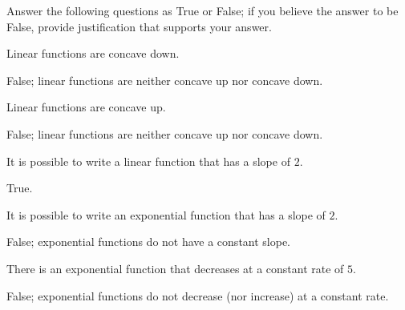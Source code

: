 \begin{exercises}
\begin{problem}
Answer the following questions as True or False; if you believe the answer 
to be False, provide justification that supports your answer.
\begin{subproblem}
	Linear functions are concave down.
	\begin{shortsolution}
		False; linear functions are neither concave up nor concave down.
	\end{shortsolution}
\end{subproblem}
\begin{subproblem}
	Linear functions are concave up.
	\begin{shortsolution}
		False; linear functions are neither concave up nor concave down.
	\end{shortsolution}
\end{subproblem}
\begin{subproblem}
	It is possible to write a linear function that has a slope of $2$.
	\begin{shortsolution}
		True.
	\end{shortsolution}
\end{subproblem}
\begin{subproblem}
	It is possible to write an exponential function that has a slope of $2$.
	\begin{shortsolution}
		False; exponential functions do not have a constant slope.
	\end{shortsolution}
\end{subproblem}
\begin{subproblem}
	There is an exponential function that decreases at a constant rate of $5$.
	\begin{shortsolution}
		False; exponential functions do not decrease (nor increase) at a constant rate.
	\end{shortsolution}
\end{subproblem}
\end{problem}
			

\end{exercises}
